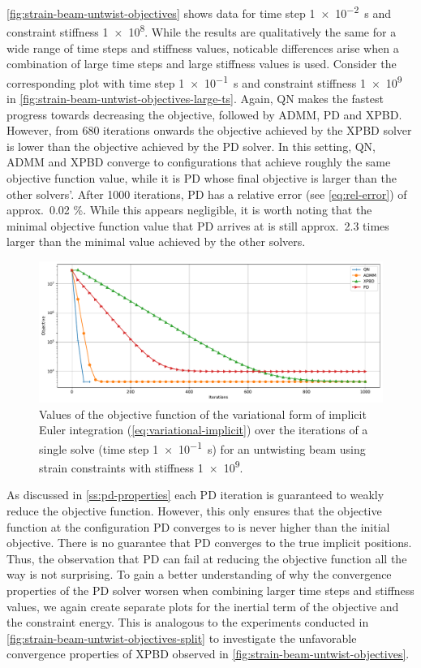 \autoref{fig:strain-beam-untwist-objectives} shows data for time step \SI{1e-2}{\second} and constraint stiffness \num{1e8}. While the results are qualitatively 
the same for a wide range of time steps and stiffness values, noticable differences arise when a combination of large time steps and large stiffness values is used.
Consider the corresponding plot with time step \SI{1e-1}{\second} and constraint stiffness \num{1e9} in \autoref{fig:strain-beam-untwist-objectives-large-ts}. Again,
QN makes the fastest progress towards decreasing the objective, followed by ADMM, PD and XPBD. However, from 680 iterations onwards the objective achieved by the XPBD 
solver is lower than the objective achieved by the PD solver. In this setting, QN, ADMM and XPBD converge to configurations that achieve roughly the same objective 
function value, while it is PD whose final objective is larger than the other solvers'. After 1000 iterations, PD has a relative error (see \cref{eq:rel-error}) 
of approx.\ 0.02 \%. While this appears negligible, it is worth noting that the minimal objective function value that PD arrives at is still approx.\ 2.3 
times larger than the minimal value achieved by the other solvers.


\begin{figure}[h]
    \includegraphics[width=\textwidth]{figures/strain_beam_untwist_objectives_large_ts.pdf}
    \caption{Values of the objective function of the variational form of implicit Euler integration (\cref{eq:variational-implicit}) over the iterations of a single solve (time step 
    \SI{1e-1}{\second}) for an untwisting beam using strain constraints with stiffness \num{1e9}.}
    \label{fig:strain-beam-untwist-objectives-large-ts}
\end{figure}

As discussed in \autoref{ss:pd-properties} each PD iteration is guaranteed to weakly reduce the objective function. However, this only ensures that the objective function 
at the configuration PD converges to is never higher than the initial objective. There is no guarantee that 
PD converges to the true implicit positions. Thus, the observation that PD can fail at reducing the objective function all the way is not surprising. To gain a better 
understanding of why the convergence properties of the PD solver worsen when combining larger time steps and stiffness values, we again create separate plots for the 
inertial term of the objective and the constraint energy. This is analogous to the experiments conducted in \autoref{fig:strain-beam-untwist-objectives-split} to investigate 
the unfavorable convergence properties of XPBD observed in \autoref{fig:strain-beam-untwist-objectives}. 

